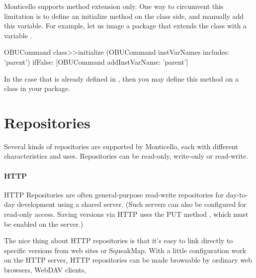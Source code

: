 \documentclass[a4paper,10pt,twoside]{book}
\begin{document}

Monticello supports method extension only. One way to circumvent this limitation is to define an initialize method on the class side, and manually add this variable. For example, let us image  a package that extends the class  with a variable .

\begin{code}{}
OBUCommand class>>initialize
	(OBUCommand instVarNames includes: 'parent') 
		ifFalse: [OBUCommand addInstVarName: 'parent']
\end{code}

In the case that  is already defined in , then you may define this  method on a class in your package.


\section{Repositories}

Several kinds of repositories are supported by Monticello, each with different characteristics and uses. Repositories can be read-only, write-only or read-write.  

\paragraph{HTTP} HTTP Repositories are often general-purpose read-write repositories for day-to-day  development using a shared server. (Such servers can also be configured for read-only access. Saving versions via HTTP uses the PUT method , which must be enabled on the server.)

The nice thing about HTTP repositories is that it's easy to link directly to specific versions from web sites or SqueakMap. With a little configuration work on the HTTP server, HTTP repositories can be made browsable by ordinary web browsers, WebDAV clients, \etc
{}
\end{document}

